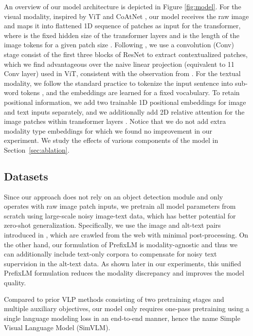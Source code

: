 \documentclass{article} \usepackage{iclr2022_conference,times}
\begin{document}
An overview of our model architecture is depicted in Figure \ref{fig:model}.
For the visual modality, inspired by ViT \citep{dosovitskiy2021an} and CoAtNet \citep{dai2021coatnet},
our model receives the raw image  
and maps it into flattened 1D sequence of patches  as input for the transformer,
where  is the fixed hidden size of the transformer layers and 
is the length of the image tokens for a given patch size .
Following \cite{dai2021coatnet},
we use a convolution (Conv) stage consist of the first three blocks of ResNet \citep{he2016deep} to extract contextualized patches,
which we find advantageous over the naive linear projection (equivalent to 11 Conv layer) used in ViT,
consistent with the observation from \citep{xiao2021early}.
For the textual modality, we follow the standard practice to tokenize the input sentence into sub-word tokens \citep{kudo2018sentencepiece},
and the embeddings are learned for a fixed vocabulary.
To retain positional information,
we add two trainable 1D positional embeddings for image and text inputs separately,
and we additionally add 2D relative attention for the image patches within transformer layers \citep{dai2021coatnet}.
Notice that we do not add extra modality type embeddings for which we found no improvement in our experiment.
We study the effects of various components of the model in Section~\ref{sec:ablation}.


\subsection{Datasets}

Since our approach does not rely on an object detection module and only operates with raw image patch inputs,
we pretrain all model parameters from scratch using large-scale noisy image-text data,
which has better potential for zero-shot generalization.
Specifically,
we use the image and alt-text pairs introduced in \cite{jia2021scaling},
which are crawled from the web with minimal post-processing.
On the other hand,
our formulation of PrefixLM
is modality-agnostic and thus
we can additionally include text-only corpora to compensate for noisy text supervision in the alt-text data.
As shown later in our experiments,
this unified PrefixLM formulation reduces the modality discrepancy and improves the model quality.

Compared to prior VLP methods consisting of two pretraining stages and multiple auxiliary objectives,
our model only requires one-pass pretraining using a single language modeling loss in an end-to-end manner, 
hence the name Simple Visual Language Model (SimVLM).
\end{document}
